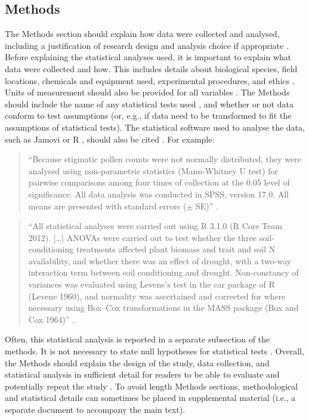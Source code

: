 \documentclass[
]{scrbook}
\begin{document}
\hypertarget{methods}{%
\subsection{Methods}\label{methods}}

The Methods section should explain how data were collected and analysed, including a justification of research design and analysis choice if appropriate \citep{Bouma2000}.
Before explaining the statistical analyses used, it is important to explain what data were collected and how.
This includes details about biological species, field locations, chemicals and equipment used, experimental procedures, and ethics \citep{council2006scientific, Woodford1999}.
Units of measurement should also be provided for all variables \citep{Lang1997}.
The Methods should include the name of any statistical tests used \citep{council2006scientific}, and whether or not data conform to test assumptions (or, e.g., if data need to be transformed to fit the assumptions of statistical tests).
The statistical software used to analyse the data, such as Jamovi \citep{Jamovi2022} or R \citep{Rproject}, should also be cited \citep{Lang1997, council2006scientific}.
For example:

\begin{quote}
``Because stigmatic pollen counts were not normally distributed, they were analysed using non-parametric statistics (Mann-Whitney U test) for pairwise comparisons among four times of collection at the 0.05 level of significance. All data analysis was conducted in SPSS, version 17.0. All means are presented with standard errors (\(\pm\) SE)'' \citep{Xiong2013}.
\end{quote}

\begin{quote}
``All statistical analyses were carried out using R 3.1.0 (R Core Team 2012). {[}\ldots{]} ANOVAs were carried out to test whether the three soil-conditioning treatments affected plant biomass and trait and soil N availability, and whether there was an effect of drought, with a two-way interaction term between soil conditioning and drought. Non-constancy of variances was evaluated using Levene's test in the car package of R (Levene 1960), and normality was ascertained and corrected for where necessary using Box--Cox transformations in the MASS package (Box and Cox 1964)'' \citep{Fry2018}.
\end{quote}

Often, this statistical analysis is reported in a separate subsection of the methods.
It is not necessary to state null hypotheses for statistical tests \citep{Lang1997}.
Overall, the Methods should explain the design of the study, data collection, and statistical analysis in sufficient detail for readers to be able to evaluate and potentially repeat the study \citep{Woodford1999}.
To avoid length Methods sections, methodological and statistical details can sometimes be placed in supplemental material (i.e., a separate document to accompany the main text).
\end{document}

